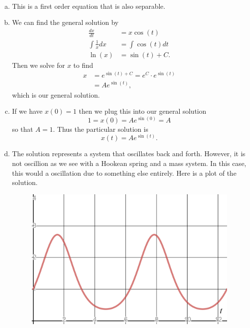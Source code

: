 \documentclass[12pt]{article} %
\begin{document}
\begin{solution}~
\begin{enumerate}[(a)]
    \item This is a first order equation that is also separable.
    \item We can find the general solution by 
    \begin{align*}
        \frac{dx}{dt}&= x\cos(t)\\
        \int \frac{1}{x}dx &= \int \cos(t)dt\\
        \ln(x)&=\sin(t)+C.
    \end{align*}
    Then we solve for $x$ to find
    \begin{align*}
        x&=e^{\sin(t)+C}=e^C \cdot e^{\sin(t)}\\
        &= Ae^{\sin(t)},
    \end{align*}
    which is our general solution.
    \item If we have $x(0)=1$ then we plug this into our general solution
    \[
    1=x(0)=Ae^{\sin(0)}=A
    \]
    so that $A=1$. Thus the particular solution is
    \[
    \boxed{x(t)=Ae^{\sin(t)}.}
    \]
    \item The solution represents a system that oscillates back and forth. However, it is not oscillion as we see with a Hookean spring and a mass system.  In this case, this would a oscillation due to something else entirely. Here is a plot of the solution.
    \begin{figure}[H]
        \centering
        \includegraphics[width=\textwidth]{Homework_2/esint.png}
    \end{figure}
\end{enumerate}
\end{solution}
\end{document}
